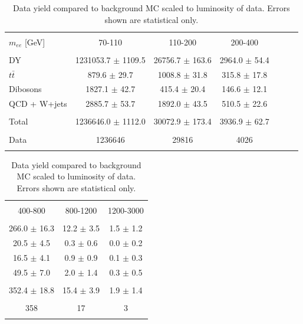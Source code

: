	\begin{table}[h!]
	\centering %
	\begin{tabular}{l cccccc} %
	\hline\hline \\[-2ex] %
	$m_{ee}$ [GeV] & 70-110 & 110-200 & 200-400 \\  [0.2ex]
	\hline  \\[-2ex] %
	DY & 1231053.7 $\pm$ 1109.5 & 26756.7 $\pm$ 163.6 & 2964.0 $\pm$ 54.4 \\ 
	$t\bar{t}$ & 879.6 $\pm$ 29.7 & 1008.8 $\pm$ 31.8 & 315.8 $\pm$ 17.8 \\ 
	Dibosons & 1827.1 $\pm$ 42.7 & 415.4 $\pm$ 20.4 & 146.6 $\pm$ 12.1 \\ 
	QCD + W+jets & 2885.7 $\pm$ 53.7 & 1892.0 $\pm$ 43.5 & 510.5 $\pm$ 22.6 \\ [0.2ex]
	\hline  \\[-2ex] %
	Total & 1236646.0 $\pm$ 1112.0 & 30072.9 $\pm$ 173.4 & 3936.9 $\pm$ 62.7 \\ [0.2ex]
	\hline  \\[-2ex] %
	Data & 1236646 & 29816 & 4026 \\ [0.2ex]
	\hline\hline  \\ %
	\end{tabular}
	\begin{tabular}{ccc} %
	\hline\hline \\[-2ex] %
	400-800 & 800-1200 & 1200-3000 \\  [0.2ex]
	\hline  \\[-2ex] %
	266.0 $\pm$ 16.3 & 12.2 $\pm$ 3.5 & 1.5 $\pm$ 1.2 \\ 
	20.5 $\pm$ 4.5 & 0.3 $\pm$ 0.6 & 0.0 $\pm$ 0.2 \\ 
	16.5 $\pm$ 4.1 & 0.9 $\pm$ 0.9 & 0.1 $\pm$ 0.3 \\ 
	49.5 $\pm$ 7.0 & 2.0 $\pm$ 1.4 & 0.3 $\pm$ 0.5 \\ [0.2ex]
	\hline  \\[-2ex] %
	352.4 $\pm$ 18.8 & 15.4 $\pm$ 3.9 & 1.9 $\pm$ 1.4 \\ [0.2ex]
	\hline  \\[-2ex] %
	358 & 17 & 3 \\ [0.2ex]
	\hline\hline  \\ %
	\end{tabular}
	\caption{Data yield compared to background MC scaled to luminosity of data. Errors shown are statistical only.} %
	\label{tab:dataMCyields}
	\end{table}



